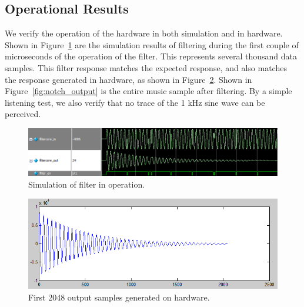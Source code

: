 \documentclass[]{article}
\begin{document}

\subsection{Operational Results} %
\label{sub:operational_results}

We verify the operation of the hardware in both simulation and in hardware.
Shown in Figure~\ref{fig:notch_sim} are the simulation results of filtering during the first couple of microseconds of the operation of the filter. This represents several thousand data samples.
This filter response matches the expected response, and also matches the response generated in hardware, as shown in Figure~\ref{fig:short_hardware_output}.
Shown in Figure~\ref{fig:notch_output} is the entire music sample after filtering. By a simple listening test, we also verify that no trace of the 1 kHz sine wave can be perceived.


\begin{figure}[b]
	\begin{center}
		\includegraphics[width = \textwidth]{Notch_proper_data_cropped.png}
	\end{center}
	\caption{Simulation of filter in operation.}
	\label{fig:notch_sim}
\end{figure}

\begin{figure}[p]
	\begin{center}
		\includegraphics[width = \textwidth]{initaldatabackfromboard.PNG}
	\end{center}
	\caption{First 2048 output samples generated on hardware.}
	\label{fig:short_hardware_output}
\end{figure}
\end{document}
